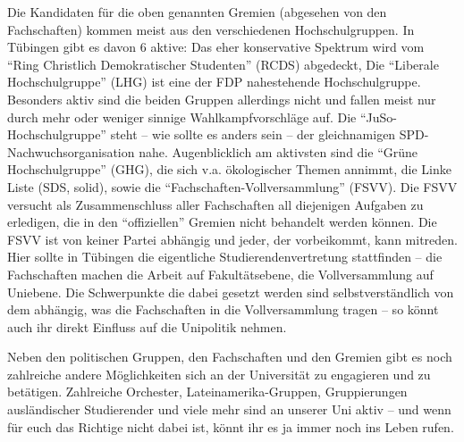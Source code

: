 Die Kandidaten für die oben genannten Gremien (abgesehen von den
  Fachschaften) kommen meist aus den verschiedenen Hochschulgruppen.  In
  Tübingen gibt es davon 6  aktive: Das eher konservative Spektrum wird vom
"`Ring Christlich Demokratischer Studenten"' (RCDS) abgedeckt,
  Die
  "`Liberale Hochschulgruppe"' (LHG) ist eine der FDP nahestehende
  Hochschulgruppe. %
  Besonders aktiv sind die beiden Gruppen allerdings nicht und fallen
meist nur durch mehr oder weniger sinnige Wahlkampfvorschläge auf. Die
  "`JuSo-Hochschulgruppe"'
  steht -- wie sollte es anders sein -- der gleichnamigen
  SPD-Nachwuchsorganisation nahe.
  Augenblicklich am aktivsten sind die "`Grüne Hochschulgruppe"' (GHG),
  die sich v.a. ökologischer Themen annimmt, die Linke Liste (SDS, solid),
  sowie die "`Fachschaften-Vollversammlung"' (FSVV).
  Die FSVV versucht als Zusammenschluss
  aller Fachschaften all diejenigen Aufgaben zu erledigen, die in
  den "`offiziellen"' Gremien nicht behandelt werden können.  Die FSVV ist
  von keiner Partei abhängig und jeder, der vorbeikommt, kann mitreden.
  Hier sollte in Tübingen die eigentliche Studierendenvertretung stattfinden --
  die Fachschaften machen die Arbeit auf Fakultätsebene, die
  Vollversammlung auf Uniebene. Die Schwerpunkte die dabei gesetzt werden
sind selbstverständlich von dem abhängig, was die Fachschaften in die
Vollversammlung tragen -- so könnt auch ihr direkt Einfluss auf die
Unipolitik nehmen.



%

Neben den politischen Gruppen, den Fachschaften und den Gremien gibt es
noch zahlreiche andere Möglichkeiten sich an der Universität zu
engagieren und zu betätigen. Zahlreiche Orchester, Lateinamerika-Gruppen,
Gruppierungen ausländischer Studierender und viele mehr sind an
unserer Uni aktiv -- und wenn für euch das Richtige nicht dabei ist,
könnt ihr es ja immer noch ins Leben rufen.
\vspace{2cm}
